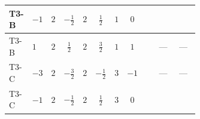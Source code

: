 \documentclass[8pt]{article}
\begin{document}
\begin{landscape}
\begin{longtable}{@{}llcccccc >{\raggedright\arraybackslash}p{0.21\linewidth} >{\raggedright\arraybackslash}p{0.21\linewidth} >{\raggedright\arraybackslash}p{0.21\linewidth}@{}}
T3-B & $-1$ & $2$ & $-\frac{1}{2}$ & $2$ & $\frac{1}{2}$ & $1$ & $0$ & \scriptsize\adjustbox{max width=\linewidth}{$\begin{gathered} +\frac{3 {\lambda_{HS_1}^{(A)}}^2}{4}\end{gathered}$} & \scriptsize\adjustbox{max width=\linewidth}{$\begin{gathered} +{\lambda_{H H^\dagger S_1^\dagger S_2^\dagger}^{\rm Cross}} \left(\frac{1}{2} \operatorname{Tr}\!\left({y_1}\,\left({y_2}\right)^{\dagger}\right)+4 \left({\lambda_{H H^\dagger S_1^\dagger S_2^\dagger}^{\rm Cross}}\right)^{*}+3 \left({\lambda_{11}}\right)^{*}\right)\end{gathered}$} & \scriptsize\adjustbox{max width=\linewidth}{$\begin{gathered} +\frac{1}{2} \left({\lambda_{H H^\dagger S_1^\dagger S_2^\dagger}^{\rm Cross}}\right)^{*} \operatorname{Tr}\!\left({y_2}\,\left({y_1}\right)^{\dagger}\right)\end{gathered}$} \\
\midrule
T3-B & $1$ & $2$ & $\frac{1}{2}$ & $2$ & $\frac{3}{2}$ & $1$ & $1$ & \scriptsize\adjustbox{max width=\linewidth}{$\begin{gathered} +\frac{3 {\lambda_{HS_1}^{(A)}}^2}{4}\end{gathered}$} & --- & --- \\
\midrule
T3-C & $-3$ & $2$ & $-\frac{3}{2}$ & $2$ & $-\frac{1}{2}$ & $3$ & $-1$ & \scriptsize\adjustbox{max width=\linewidth}{$\begin{gathered} +\frac{3 {\lambda_{HS_1}^{(A)}}^2}{4}\end{gathered}$} & --- & --- \\
\midrule
T3-C & $-1$ & $2$ & $-\frac{1}{2}$ & $2$ & $\frac{1}{2}$ & $3$ & $0$ & \scriptsize\adjustbox{max width=\linewidth}{$\begin{gathered} +\frac{3 {\lambda_{HS_1}^{(A)}}^2}{4}\end{gathered}$} & \scriptsize\adjustbox{max width=\linewidth}{$\begin{gathered} +{\lambda_{H H^\dagger S_1^\dagger S_2^\dagger}^{\rm Cross}} \left(\frac{3}{4} \operatorname{Tr}\!\left({y_1}\,\left({y_2}\right)^{\dagger}\right)+4 \left({\lambda_{H H^\dagger S_1^\dagger S_2^\dagger}^{\rm Cross}}\right)^{*}+3 \left({\lambda_{11}}\right)^{*}\right)\end{gathered}$} & \scriptsize\adjustbox{max width=\linewidth}{$\begin{gathered} +\frac{3}{4} \left({\lambda_{H H^\dagger S_1^\dagger S_2^\dagger}^{\rm Cross}}\right)^{*} \operatorname{Tr}\!\left({y_2}\,\left({y_1}\right)^{\dagger}\right)\end{gathered}$} \\

\end{longtable}
\end{landscape}
\end{document}
